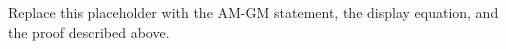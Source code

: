 \documentclass{article}
\begin{document}
Replace this placeholder with the AM-GM statement, the display
equation, and the proof described above.
\end{document}
